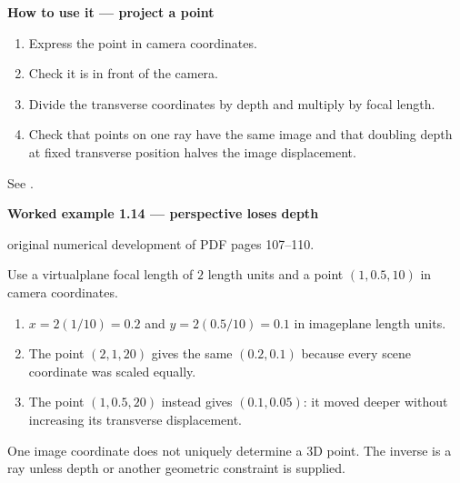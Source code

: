 \documentclass[letterpaper,11pt,english,openany,oneside]{jupyterBook}
\begin{document}
\begin{TextbookBox}
\textbf{How to use it — project a point}\par\smallskip
\begin{enumerate}
%
\item {}
\sphinxAtStartPar
Express the point in camera coordinates.

\item {}
\sphinxAtStartPar
Check it is in front of the camera.

\item {}
\sphinxAtStartPar
Divide the transverse coordinates by depth and multiply by focal length.

\item {}
\sphinxAtStartPar
Check that points on one ray have the same image and that doubling depth at fixed transverse position halves the image displacement.

\end{enumerate}

\sphinxAtStartPar
See {\hyperref[\detokenize{lectures/lecture01/cameras:ex-lec01-projection}]{}}.

\end{TextbookBox}
\label{\detokenize{lectures/lecture01/cameras:ex-lec01-projection}}
\begin{TextbookBox}
\textbf{Worked example 1.14 — perspective loses depth}\par\smallskip

\sphinxAtStartPar
{} original numerical development of PDF pages 107–110.

\sphinxAtStartPar
Use a virtual\sphinxhyphen{}plane focal length of \(2\) length units and a point \((1,0.5,10)\) in camera coordinates.
\begin{enumerate}
%
\item {}
\sphinxAtStartPar
\(x=2(1/10)=0.2\) and \(y=2(0.5/10)=0.1\) in image\sphinxhyphen{}plane length units.

\item {}
\sphinxAtStartPar
The point \((2,1,20)\) gives the same \((0.2,0.1)\) because every scene coordinate was scaled equally.

\item {}
\sphinxAtStartPar
The point \((1,0.5,20)\) instead gives \((0.1,0.05)\): it moved deeper without increasing its transverse displacement.

\end{enumerate}

\sphinxAtStartPar
One image coordinate does not uniquely determine a 3D point. The inverse is a ray unless depth or another geometric constraint is supplied.

\end{TextbookBox}
\end{document}

